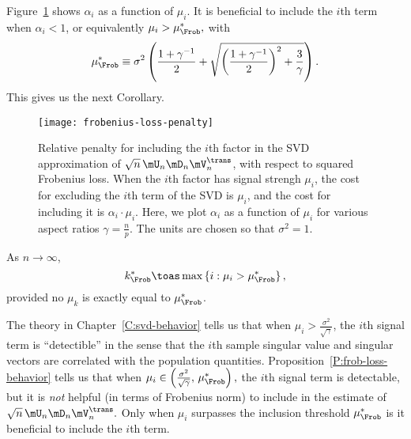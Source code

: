 Figure~\ref{F:frobenius-loss-penalty} shows $\alpha_i$ as a function of
$\mu_i$.  It is beneficial to include the $i$th term when $\alpha_i < 1$,
or equivalently
\(
    \mu_i
    >
    \mu_\Frob^\ast,
\)
with
\begin{equation}\label{E:frob-cutoff}
    \mu_\Frob^\ast
    \equiv
    \sigma^2
    \left(
    \frac{1 + \gamma^{-1}}{2}
    +
    \sqrt{ 
        \left( \frac{1 + \gamma^{-1} }{2} \right)^2
        +
        \frac{3}{\gamma}
    }
    \right).
\end{equation}
This gives us the next Corollary.

\begin{figure}[tbh]
    \centering
    \texttt{[image: frobenius-loss-penalty]}
    \caption{
        Relative penalty for including the $i$th factor in the SVD 
        approximation of $\sqrt{n} \, \mU_n \mD_n \mV_n^\trans$, with
        respect to squared Frobenius loss.  When the $i$th factor
        has signal strengh $\mu_i$, the cost for excluding the $i$th term
        of the SVD is $\mu_i$, and the cost for including it is 
        $\alpha_i \cdot \mu_i$.  Here, we plot $\alpha_i$ as a function
        of $\mu_i$ for various aspect ratios $\gamma = \frac{n}{p}$.
        The units are chosen so that $\sigma^2 = 1$.
    }\label{F:frobenius-loss-penalty}
\end{figure}

\begin{corollary}
    As $n\to\infty$,
    \[
        k^\ast_\Frob
            \toas
                \max \left\{ i : \mu_i > \mu_\Frob^\ast \right\},
    \]
    provided no $\mu_k$ is exactly equal to $\mu_\Frob^\ast$.
\end{corollary}

\noindent
The theory in Chapter~\ref{C:svd-behavior} tells us that when 
$\mu_i > \frac{\sigma^2}{\sqrt{\gamma}}$, the $i$th signal term
is ``detectible'' in the sense that the $i$th sample singular value and singular vectors are correlated with the population quantities.  Proposition~\ref{P:frob-loss-behavior} tells us that when 
\(
    \mu_i 
    \in 
    \left(
        \frac{\sigma^2}{\sqrt{\gamma}}, \, 
        \mu_\Frob^\ast
    \right),
\)
the $i$th signal term is detectable, but it is \emph{not} helpful (in terms
of Frobenius norm) to include in the estimate of
\(
    \sqrt{n} \, \mU_n \mD_n \mV_n^\trans.
\)
Only when $\mu_i$ surpasses the inclusion threshold $\mu_\Frob^\ast$ is it
beneficial to include the $i$th term.

